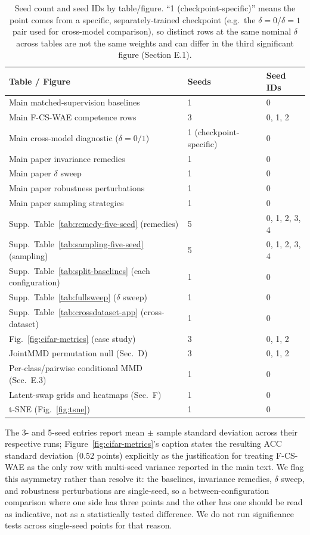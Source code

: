\documentclass[letterpaper]{article} %
\newcommand{\ours}{F-CS-WAE}
\begin{document}
\begin{table}[h]
\centering
\tiny
\setlength{\tabcolsep}{3pt}
\caption{Seed count and seed IDs by table/figure. ``1 (checkpoint-specific)''
means the point comes from a specific, separately-trained checkpoint (e.g.\
the $\delta{=}0$/$\delta{=}1$ pair used for cross-model comparison), so
distinct rows at the same nominal $\delta$ across tables are not the same
weights and can differ in the third significant figure (Section E.1).}
\label{tab:seedmap}
\begin{tabular}{lll}
\toprule
Table / Figure & Seeds & Seed IDs \\
\midrule
Main matched-supervision baselines & 1 & 0 \\
Main \ours{} competence rows & 3 & 0, 1, 2 \\
Main cross-model diagnostic ($\delta{=}0/1$) & 1 (checkpoint-specific) & 0 \\
Main paper invariance remedies & 1 & 0 \\
Main paper $\delta$ sweep & 1 & 0 \\
Main paper robustness perturbations & 1 & 0 \\
Main paper sampling strategies & 1 & 0 \\
Supp.\ Table~\ref{tab:remedy-five-seed} (remedies) & 5 & 0, 1, 2, 3, 4 \\
Supp.\ Table~\ref{tab:sampling-five-seed} (sampling) & 5 & 0, 1, 2, 3, 4 \\
Supp.\ Table~\ref{tab:split-baselines} (each configuration) & 1 & 0 \\
Supp.\ Table~\ref{tab:fullsweep} ($\delta$ sweep) & 1 & 0 \\
Supp.\ Table~\ref{tab:crossdataset-app} (cross-dataset) & 1 & 0 \\
Fig.~\ref{fig:cifar-metrics} (case study) & 3 & 0, 1, 2 \\
JointMMD permutation null (Sec.\ D) & 3 & 0, 1, 2 \\
Per-class/pairwise conditional MMD (Sec.\ E.3) & 1 & 0 \\
Latent-swap grids and heatmaps (Sec.\ F) & 1 & 0 \\
t-SNE (Fig.~\ref{fig:tsne}) & 1 & 0 \\
\bottomrule
\end{tabular}
\end{table}

The 3- and 5-seed entries report mean $\pm$ sample standard deviation across
their respective runs; Figure~\ref{fig:cifar-metrics}'s caption states the
resulting ACC standard deviation ($0.52$ points) explicitly as the justification for
treating \ours{} as the only row with multi-seed variance reported in the
main text. We flag this asymmetry rather than resolve it: the baselines,
invariance remedies, $\delta$ sweep, and robustness perturbations are
single-seed, so a between-configuration comparison where one side has three
points and the other has one should be read as indicative, not as a
statistically tested difference. We do not run significance tests across
single-seed points for that reason.
\end{document}
